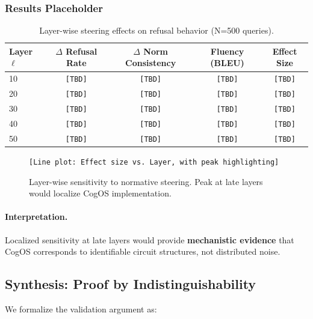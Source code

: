 \documentclass[11pt]{article}
\begin{document}
\subsubsection{Results Placeholder}

\begin{table}[h]
\centering
\caption{Layer-wise steering effects on refusal behavior (N=500 queries).}
\label{tab:layer-steering-results}
\begin{tabular}{lcccc}
\toprule
Layer $\ell$ & $\Delta$ Refusal Rate & $\Delta$ Norm Consistency & Fluency (BLEU) & Effect Size \\
\midrule
10 & \texttt{[TBD]} & \texttt{[TBD]} & \texttt{[TBD]} & \texttt{[TBD]} \\
20 & \texttt{[TBD]} & \texttt{[TBD]} & \texttt{[TBD]} & \texttt{[TBD]} \\
30 & \texttt{[TBD]} & \texttt{[TBD]} & \texttt{[TBD]} & \texttt{[TBD]} \\
40 & \texttt{[TBD]} & \texttt{[TBD]} & \texttt{[TBD]} & \texttt{[TBD]} \\
50 & \texttt{[TBD]} & \texttt{[TBD]} & \texttt{[TBD]} & \texttt{[TBD]} \\
\bottomrule
\end{tabular}
\end{table}

\begin{figure}[h]
\centering
\texttt{[Line plot: Effect size vs. Layer, with peak highlighting]}
\caption{Layer-wise sensitivity to normative steering. Peak at late layers would localize CogOS implementation.}
\label{fig:layer-steering}
\end{figure}

\paragraph{Interpretation.} Localized sensitivity at late layers would provide \textbf{mechanistic evidence} that CogOS corresponds to identifiable circuit structures, not distributed noise.

\subsection{Synthesis: Proof by Indistinguishability}

We formalize the validation argument as:
\end{document}
